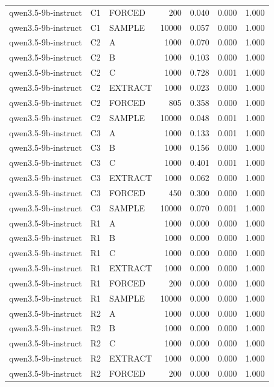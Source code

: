 \begin{table}
\begin{tabular}{lllrrrr}
qwen3.5-9b-instruct & C1 & FORCED & 200 & 0.040 & 0.000 & 1.000 \\
qwen3.5-9b-instruct & C1 & SAMPLE & 10000 & 0.057 & 0.000 & 1.000 \\
qwen3.5-9b-instruct & C2 & A & 1000 & 0.070 & 0.000 & 1.000 \\
qwen3.5-9b-instruct & C2 & B & 1000 & 0.103 & 0.000 & 1.000 \\
qwen3.5-9b-instruct & C2 & C & 1000 & 0.728 & 0.001 & 1.000 \\
qwen3.5-9b-instruct & C2 & EXTRACT & 1000 & 0.023 & 0.000 & 1.000 \\
qwen3.5-9b-instruct & C2 & FORCED & 805 & 0.358 & 0.000 & 1.000 \\
qwen3.5-9b-instruct & C2 & SAMPLE & 10000 & 0.048 & 0.001 & 1.000 \\
qwen3.5-9b-instruct & C3 & A & 1000 & 0.133 & 0.001 & 1.000 \\
qwen3.5-9b-instruct & C3 & B & 1000 & 0.156 & 0.000 & 1.000 \\
qwen3.5-9b-instruct & C3 & C & 1000 & 0.401 & 0.001 & 1.000 \\
qwen3.5-9b-instruct & C3 & EXTRACT & 1000 & 0.062 & 0.000 & 1.000 \\
qwen3.5-9b-instruct & C3 & FORCED & 450 & 0.300 & 0.000 & 1.000 \\
qwen3.5-9b-instruct & C3 & SAMPLE & 10000 & 0.070 & 0.001 & 1.000 \\
qwen3.5-9b-instruct & R1 & A & 1000 & 0.000 & 0.000 & 1.000 \\
qwen3.5-9b-instruct & R1 & B & 1000 & 0.000 & 0.000 & 1.000 \\
qwen3.5-9b-instruct & R1 & C & 1000 & 0.000 & 0.000 & 1.000 \\
qwen3.5-9b-instruct & R1 & EXTRACT & 1000 & 0.000 & 0.000 & 1.000 \\
qwen3.5-9b-instruct & R1 & FORCED & 200 & 0.000 & 0.000 & 1.000 \\
qwen3.5-9b-instruct & R1 & SAMPLE & 10000 & 0.000 & 0.000 & 1.000 \\
qwen3.5-9b-instruct & R2 & A & 1000 & 0.000 & 0.000 & 1.000 \\
qwen3.5-9b-instruct & R2 & B & 1000 & 0.000 & 0.000 & 1.000 \\
qwen3.5-9b-instruct & R2 & C & 1000 & 0.000 & 0.000 & 1.000 \\
qwen3.5-9b-instruct & R2 & EXTRACT & 1000 & 0.000 & 0.000 & 1.000 \\
qwen3.5-9b-instruct & R2 & FORCED & 200 & 0.000 & 0.000 & 1.000 \\

\end{tabular}
\end{table}
